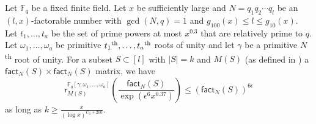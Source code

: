 \documentclass{toc}
\newcommand\F{{\mathbb{F}}}
\renewcommand\fact{\textsf{fact}}
\newcommand{\ts}{\textsuperscript}
\begin{document}
\begin{lemma}\label{lem_finitefieldblocks}
Let $\F_q$ be a fixed finite field.  Let $x$ be sufficiently large and $N = q_1q_2\cdots q_l$ be an $(l, x)$-factorable number with $\gcd(N,q) = 1$ and $g_{100}(x) \leq l \leq g_{10}(x)$. Let $t_1, \dots , t_a$ be the set of prime powers at most $x^{0.3}$ that are relatively prime to $q$.  Let $\omega_1, \dots , \omega_a$ be primitive $t_1\ts{th}, \dots , t_a\ts{th}$ 
roots of unity and let $\gamma$ be a primitive $N$\ts{th} root of unity.  For a subset $S \subset [l]$ with $|S| = k$ and $M(S)$ (as defined in )  a  $\fact_N(S) \times \fact_N(S)$ matrix,  we have 
\[
\textsf{r}^{\F_q[\gamma, \omega_1, \dots , \omega_a]}_{M(S)}\left( \frac{\fact_N(S)}{\exp\left(\epsilon^6 x^{0.37}\right)} \right) \leq \left(\fact_N(S)\right)^{6 \epsilon}
\]
as long as $k \geq \frac{x}{(\log x)^{C_0 + 200}}$.
\end{lemma}
\end{document}

